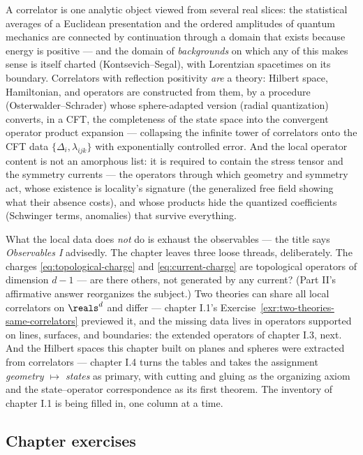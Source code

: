 A correlator is one analytic object viewed from several real slices: the
statistical averages of a Euclidean presentation and the ordered amplitudes
of quantum mechanics are connected by continuation through a domain that
exists because energy is positive --- and the domain of \emph{backgrounds} on
which any of this makes sense is itself charted (Kontsevich--Segal), with
Lorentzian spacetimes on its boundary. Correlators with reflection positivity
\emph{are} a theory: Hilbert space, Hamiltonian, and operators are
constructed from them, by a procedure (Osterwalder--Schrader) whose
sphere-adapted version (radial quantization) converts, in a CFT, the
completeness of the state space into the convergent operator product
expansion --- collapsing the infinite tower of correlators onto the CFT data
$\{\Delta_i, \lambda_{ijk}\}$ with exponentially controlled error. And the
local operator content is not an amorphous list: it is required to contain
the stress tensor and the symmetry currents --- the operators through which
geometry and symmetry act, whose existence is locality's signature
(the generalized free field showing what their absence costs), and whose
products hide the quantized coefficients (Schwinger terms, anomalies) that
survive everything.

What the local data does \emph{not} do is exhaust the observables --- the
title says \emph{Observables I} advisedly. The chapter leaves three loose
threads, deliberately. The charges
\eqref{eq:topological-charge} and \eqref{eq:current-charge} are topological
operators of dimension $d-1$ --- are there others, not generated by any
current? (Part II's affirmative answer reorganizes the subject.) Two theories
can share all local correlators on $\reals^d$ and differ --- chapter I.1's
Exercise~\ref{exr:two-theories-same-correlators} previewed it, and the
missing data lives in operators supported on lines, surfaces, and boundaries:
the extended operators of chapter I.3, next. And the Hilbert spaces this
chapter built on planes and spheres were extracted from correlators ---
chapter I.4 turns the tables and takes the assignment
\emph{geometry $\mapsto$ states} as primary, with cutting and gluing as the
organizing axiom and the state--operator correspondence as its first theorem.
The inventory of chapter I.1 is being filled in, one column at a time.

\subsection*{Chapter exercises}

